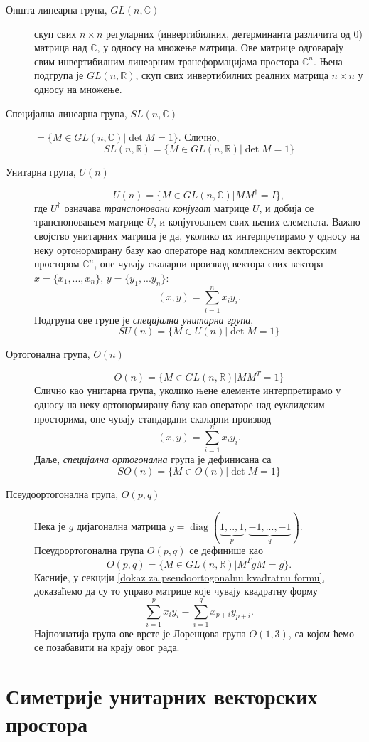 \documentclass{report}
\theoremstyle{plain}
\theoremstyle{definition}
\begin{document}
\begin{description}
  \item[Општа линеарна група, $GL(n, \mathbb{C})$]  скуп свих $n\times n$ регуларних (инвертибилних, детерминанта различита од 0) матрица над $\mathbb{C}$, у односу на множење матрица. Ове матрице одговарају свим инвертибилним линеарним трансформацијама простора $\mathbb{C}^n$. Њена подгрупа је $GL(n, \mathbb{R})$, скуп свих инвертибилних реалних матрица $n\times n$ у односу на множење.
  \item[Специјална линеарна група, $SL(n, \mathbb{C})$] $ = \{M\in GL(n, \mathbb{C})|\det M = 1\}$. Слично,
  $$SL(n, \mathbb{R}) = \{M\in GL(n, \mathbb{R})|\det M = 1\}$$
  \item[Унитарна група, $U(n)$]
  $$U(n) = \{M\in GL(n, \mathbb{C})|MM^\dag = I\},$$
  где $U^\dag$ означава \emph{транспоновани конјугат} матрице $U$, и добија се транспоновањем матрице $U$, и конјуговањем свих њених елемената. Важно својство унитарних матрица је да, уколико их интерпретирамо у односу на неку ортонормирану базу као операторе над комплексним векторским простором $\mathbb{C}^n$, оне чувају скаларни производ вектора свих вектора $x = \{x_1, ..., x_n\}$, $y = \{y_1, ...y_n\}$:
  $$(x, y) = \sum_{i=1}^n x_i \overline{y}_i.$$
  Подгрупа ове групе је \emph{специјална унитарна група},
  $$SU(n) = \{M\in U(n)|\det M = 1\}$$
  \item[Ортогонална група, $O(n)$]
  $$O(n) = \{M\in GL(n, \mathbb{R})|MM^T = 1\}$$
  Слично као унитарна група, уколико њене елементе интерпретирамо у односу на неку ортонормирану базу као операторе над еуклидским просторима, оне чувају стандардни скаларни производ
  $$(x, y) = \sum_{i=1}^n x_i y_i.$$
  Даље, \emph{специјална ортогонална} група је дефинисана са
  $$SO(n) = \{M\in O(n)|\det M = 1\}$$
  \item[Псеудоортогонална група, $O(p, q)$] Нека је $g$ дијагонална матрица $g = \operatorname{diag}(\underbrace{1, .., 1}_p, \underbrace{-1, ..., -1}_q)$. Псеудоортогонална група $O(p, q)$ се дефинише као
      $$O(p, q) = \{M\in GL(n, \mathbb{R})|M^TgM = g\}.$$
      Касније, у секцији \ref{dokaz za pseudoortogonalnu kvadratnu formu}, доказаћемо да су то управо матрице које чувају квадратну форму
      $$\sum_{i=1}^p x_iy_i - \sum_{i=1}^q x_{p+i}y_{p+i}.$$
  Најпознатија група ове врсте је Лоренцова група $O(1, 3)$, са којом ћемо се позабавити на крају овог рада.
\end{description}

\section{Симетрије унитарних векторских простора}
\end{document}
